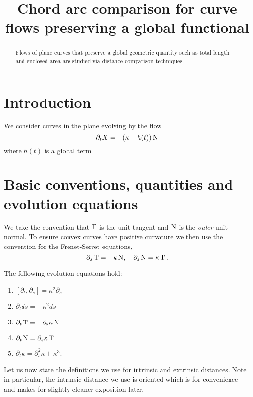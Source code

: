 \documentclass[a4paper, 12pt]{amsart}
\title[Chord arc comparison for preserving flows]{Chord arc comparison for curve flows preserving a global functional}
\date{}
\begin{document}
\begin{abstract}
Flows of plane curves that preserve a global geometric quantity such as total length and enclosed area are studied via distance comparison techniques.
\end{abstract}

\maketitle

\section{Introduction}
\label{sec:intro}

We consider curves in the plane evolving by the flow
\begin{equation}
\label{eq:flow}
\partial_t X = -(\kappa - h(t)) \operatorname{N}
\end{equation}
where \(h(t)\) is a global term.

\section{Basic conventions, quantities and evolution equations}
\label{sec:basic}

We take the convention that \(\operatorname{T}\) is the unit tangent and \(\operatorname{N}\) is the \emph{outer} unit normal. To ensure convex curves have positive curvature we then use the convention for the Frenet-Serret equations,
\begin{equation}
\label{eq:fs}
\partial_s \operatorname{T} = - \kappa \operatorname{N}, \quad \partial_s \operatorname{N} = \kappa \operatorname{T}.
\end{equation}

\begin{lemma}
\label{lem:basic_evolution}
The following evolution equations hold:
\begin{enumerate}
\item \([\partial_t, \partial_s] = \kappa^2 \partial_s\)
\item \(\partial_t ds = -\kappa^2 ds\)
\item \(\partial_t \operatorname{T} = -\partial_s \kappa\operatorname{N}\)
\item \(\partial_t \operatorname{N} = \partial_s \kappa \operatorname{T}\)
\item \(\partial_t \kappa = \partial_s^2 \kappa + \kappa^3\).
\end{enumerate}
\end{lemma}

Let us now state the definitions we use for intrinsic and extrinsic distances. Note in particular, the intrinsic distance we use is oriented which is for convenience and makes for slightly cleaner exposition later.
\end{document}
